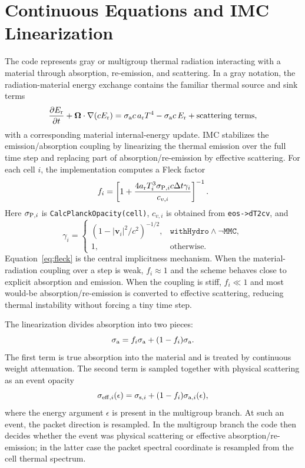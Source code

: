 \documentclass[11pt]{article}
\newcommand{\clight}{c}
\newcommand{\arad}{a_{\rm r}}
\newcommand{\sigA}{\sigma_{\rm a}}
\newcommand{\dt}{\Delta t}
\newcommand{\vcell}{\mathbf{v}}
\newcommand{\OmegaVec}{\boldsymbol{\Omega}}
\begin{document}
\section{Continuous Equations and IMC Linearization}

The code represents gray or multigroup thermal radiation interacting with a
material through absorption, re-emission, and scattering. In a gray notation,
the radiation-material energy exchange contains the familiar thermal source
and sink terms
\begin{equation}
  \frac{\partial E_{\rm r}}{\partial t}
  + \OmegaVec\cdot\nabla(c E_{\rm r})
  =
  \sigA c\, a_{\rm r}T^4
  - \sigA c\, E_{\rm r}
  + \hbox{scattering terms},
\end{equation}
with a corresponding material internal-energy update. IMC stabilizes the
emission/absorption coupling by linearizing the thermal emission over the full
time step and replacing part of absorption/re-emission by effective scattering.
For each cell \(i\), the implementation computes a Fleck factor
\begin{equation}
  f_i =
  \left[
    1 +
    \frac{4 \arad T_i^3 \sigma_{{\rm P},i} \clight \dt \gamma_i}{c_{v,i}}
  \right]^{-1}.
  \label{eq:fleck}
\end{equation}
Here \(\sigma_{{\rm P},i}\) is \texttt{CalcPlanckOpacity(cell)}, \(c_{v,i}\) is obtained
from \texttt{eos->dT2cv}, and
\begin{equation}
  \gamma_i =
  \begin{cases}
    \left(1-|\vcell_i|^2/c^2\right)^{-1/2}, & \texttt{withHydro} \wedge \neg\texttt{MMC},\\
    1, & \text{otherwise}.
  \end{cases}
\end{equation}
Equation~\eqref{eq:fleck} is the central implicitness mechanism. When the
material-radiation coupling over a step is weak, \(f_i\approx 1\) and the
scheme behaves close to explicit absorption and emission. When the coupling is
stiff, \(f_i\ll 1\) and most would-be absorption/re-emission is converted to
effective scattering, reducing thermal instability without forcing a tiny time
step.

The linearization divides absorption into two pieces:
\begin{equation}
  \sigA
  =
  f_i\sigA + (1-f_i)\sigA .
\end{equation}
The first term is true absorption into the material and is treated by
continuous weight attenuation. The second term is sampled together with
physical scattering as an event opacity
\begin{equation}
  \sigma_{{\rm eff},i}(\epsilon)
  =
  \sigma_{{\rm s},i} + (1-f_i)\sigma_{{\rm a},i}(\epsilon),
  \label{eq:effective-scattering}
\end{equation}
where the energy argument \(\epsilon\) is present in the multigroup branch. At
such an event, the packet direction is resampled. In the multigroup branch the
code then decides whether the event was physical scattering or effective
absorption/re-emission; in the latter case the packet spectral coordinate is
resampled from the cell thermal spectrum.
\end{document}
